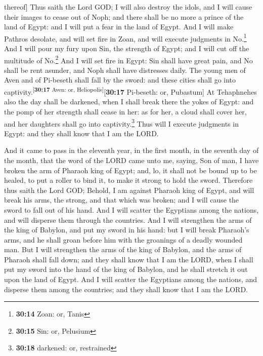 thereof{]}  Thus saith the Lord GOD; I will also destroy
the idols, and I will cause their images to cease out of Noph; and there
shall be no more a prince of the land of Egypt: and I will put a fear in
the land of Egypt.  And I will make Pathros desolate, and
will set fire in Zoan, and will execute judgments in No.\footnote{\textbf{30:14}
  Zoan: or, Tanis}  And I will pour my fury upon Sin, the
strength of Egypt; and I will cut off the multitude of No.\footnote{\textbf{30:15}
  Sin: or, Pelusium}  And I will set fire in Egypt: Sin
shall have great pain, and No shall be rent asunder, and Noph shall have
distresses daily.  The young men of Aven and of Pi-beseth
shall fall by the sword: and these cities shall go into
captivity.\textsuperscript{{[}\textbf{30:17} Aven: or,
Heliopolis{]}}{[}\textbf{30:17} Pi-beseth: or, Pubastum{]}
 At Tehaphnehes also the day shall be darkened, when I
shall break there the yokes of Egypt: and the pomp of her strength shall
cease in her: as for her, a cloud shall cover her, and her daughters
shall go into captivity.\footnote{\textbf{30:18} darkened: or,
  restrained}  Thus will I execute judgments in Egypt:
and they shall know that I am the LORD.

 And it came to pass in the eleventh year, in the first
month, in the seventh day of the month, that the word of the LORD came
unto me, saying,  Son of man, I have broken the arm of
Pharaoh king of Egypt; and, lo, it shall not be bound up to be healed,
to put a roller to bind it, to make it strong to hold the sword.
 Therefore thus saith the Lord GOD; Behold, I am against
Pharaoh king of Egypt, and will break his arms, the strong, and that
which was broken; and I will cause the sword to fall out of his hand.
 And I will scatter the Egyptians among the nations, and
will disperse them through the countries.  And I will
strengthen the arms of the king of Babylon, and put my sword in his
hand: but I will break Pharaoh's arms, and he shall groan before him
with the groanings of a deadly wounded man.  But I will
strengthen the arms of the king of Babylon, and the arms of Pharaoh
shall fall down; and they shall know that I am the LORD, when I shall
put my sword into the hand of the king of Babylon, and he shall stretch
it out upon the land of Egypt.  And I will scatter the
Egyptians among the nations, and disperse them among the countries; and
they shall know that I am the LORD.

